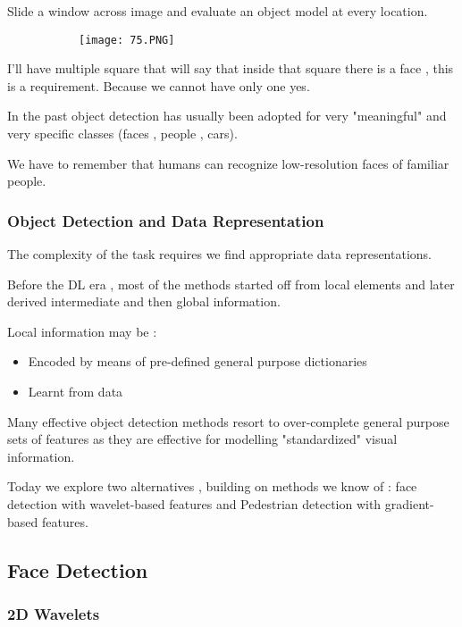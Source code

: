 \documentclass{article}
\begin{document}
Slide a window across image and evaluate an object model at every location.



\begin{figure}[ht!]
  \centering
  \begin{subfigure}[b]{0.6\linewidth}
    \texttt{[image: 75.PNG]}
  \end{subfigure}
\end{figure}


I'll have multiple square that will say that inside that square there is a face , this is a requirement. Because we cannot have only one yes.

In the past object detection has usually been adopted for very "meaningful" and very specific classes (faces , people , cars).

We have to remember that humans can recognize low-resolution faces of familiar people.

\subsubsection{Object Detection and Data Representation}

The complexity of the task requires we find appropriate data representations.

Before the DL era , most of the methods started off from local elements and later derived intermediate and then global information.

Local information may be :

\begin{itemize}
    \item Encoded by means of pre-defined general purpose dictionaries
    \item Learnt from data
\end{itemize}

Many effective object detection methods resort to over-complete general purpose sets of features as they are effective for modelling "standardized" visual information. 

Today we explore two alternatives , building on methods we know of : face detection with wavelet-based features and Pedestrian detection with gradient-based features.

\subsection{Face Detection}

\subsubsection{2D Wavelets}
\end{document}
